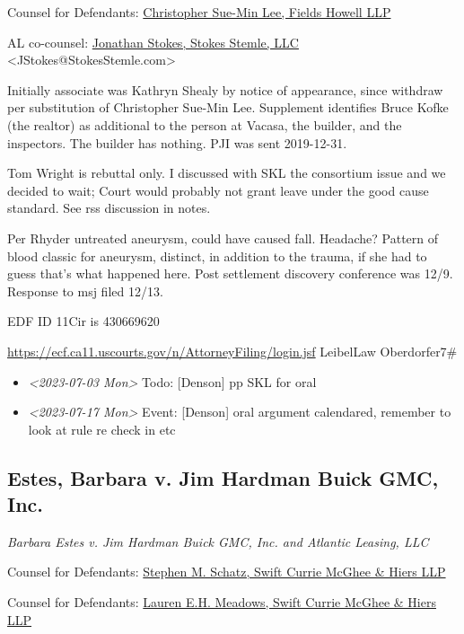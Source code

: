 \documentclass[11pt]{article}
\begin{document}
Counsel for Defendants: \href{https://gabar.reliaguide.com/lawyer/30326-GA-Christopher-Lee-281365}{Christopher Sue-Min Lee, Fields Howell LLP}

AL co-counsel: \href{https://stokesstemle.com/attorneys/jonathan-h-stokes/}{Jonathan Stokes, Stokes Stemle, LLC}  <JStokes@StokesStemle.com>

Initially associate was Kathryn Shealy by notice of appearance, since withdraw per substitution of Christopher Sue-Min Lee. Supplement identifies Bruce Kofke (the realtor) as additional to the person at Vacasa, the builder, and the inspectors. The builder has nothing. PJI was sent 2019-12-31.

Tom Wright is rebuttal only. I discussed with SKL the consortium issue and we decided to wait; Court would probably not grant leave under the good cause standard. See rss discussion in notes.

Per Rhyder untreated aneurysm, could have caused fall. Headache? Pattern of blood classic for aneurysm, distinct, in addition to the trauma, if she had to guess that's what happened here. Post settlement discovery conference was 12/9. Response to msj filed 12/13.

EDF ID 11Cir is 430669620

\url{https://ecf.ca11.uscourts.gov/n/AttorneyFiling/login.jsf}
LeibelLaw
Oberdorfer7\#

\begin{itemize}
\item \textit{<2023-07-03 Mon> } Todo: [Denson] pp SKL for oral

\item \textit{<2023-07-17 Mon> } Event: [Denson] oral argument calendared, remember to look at rule re check in etc
\end{itemize}

\subsection*{Estes, Barbara v. Jim Hardman Buick GMC, Inc.}
\label{sec:orgdba070e}

\emph{Barbara Estes v. Jim Hardman Buick GMC, Inc. and Atlantic Leasing, LLC}

Counsel for Defendants: \href{https://www.gabar.org/MemberSearchDetail.cfm?ID=NjI4ODQw}{Stephen M. Schatz, Swift Currie McGhee \& Hiers LLP}

Counsel for Defendants: \href{https://www.gabar.org/MemberSearchDetail.cfm?ID=NTc1NzU3}{Lauren E.H. Meadows, Swift Currie McGhee \& Hiers LLP}
\end{document}
